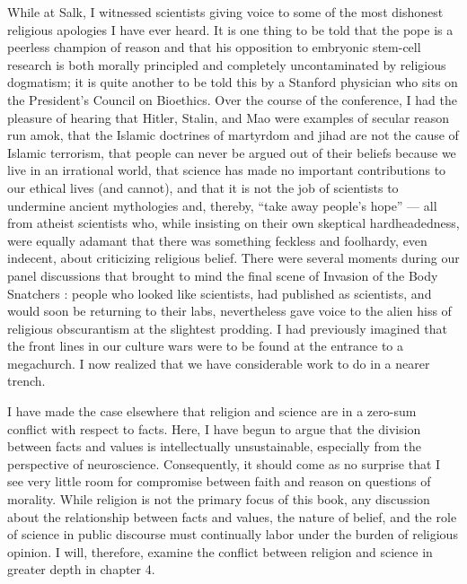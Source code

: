 \documentclass[a4paper,14pt]{extarticle}
\begin{document}
While at Salk, I witnessed scientists giving voice to some of the most dishonest religious apologies I have ever heard.
It is one thing to be told that the pope is a peerless champion of reason and that his opposition to embryonic stem-cell research is both morally principled and completely uncontaminated by religious dogmatism;
it is quite another to be told this by a Stanford physician who sits on the President's Council on Bioethics.
Over the course of the conference, I had the pleasure of hearing that Hitler, Stalin, and Mao were examples of secular reason run amok, that the Islamic doctrines of martyrdom and jihad are not the cause of Islamic terrorism, that people can never be argued out of their beliefs because we live in an irrational world, that science has made no important contributions to our ethical lives (and cannot), and that it is not the job of scientists to undermine ancient mythologies and, thereby, “take away people's hope” --- all from atheist scientists who, while insisting on their own skeptical hardheadedness, were equally adamant that there was something feckless and foolhardy, even indecent, about criticizing religious belief.
There were several moments during our panel discussions that brought to mind the final scene of Invasion of the Body Snatchers :
people who looked like scientists, had published as scientists, and would soon be returning to their labs, nevertheless gave voice to the alien hiss of religious obscurantism at the slightest prodding.
I had previously imagined that the front lines in our culture wars were to be found at the entrance to a megachurch.
I now realized that we have considerable work to do in a nearer trench.

I have made the case elsewhere that religion and science are in a zero-sum conflict with respect to facts.
Here, I have begun to argue that the division between facts and values is intellectually unsustainable, especially from the perspective of neuroscience.
Consequently, it should come as no surprise that I see very little room for compromise between faith and reason on questions of morality.
While religion is not the primary focus of this book, any discussion about the relationship between facts and values, the nature of belief, and the role of science in public discourse must continually labor under the burden of religious opinion.
I will, therefore, examine the conflict between religion and science in greater depth in chapter 4.
\end{document}
